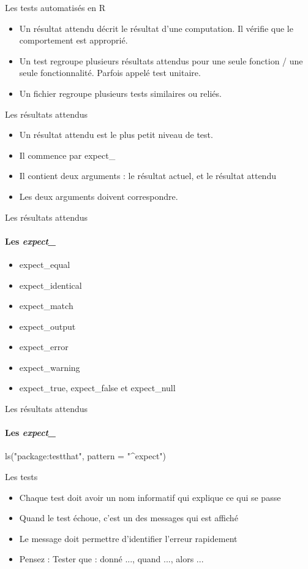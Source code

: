 \documentclass[11pt]{beamer}
\begin{document}
\begin{frame}{Les tests automatisés en R}
\begin{itemize}
\item Un résultat attendu décrit le résultat d'une computation. Il vérifie que le comportement est approprié.
\item Un test regroupe plusieurs résultats attendus pour une seule fonction / une seule fonctionnalité. Parfois appelé test unitaire.
\item Un fichier regroupe plusieurs tests similaires ou reliés.
\end{itemize}
\end{frame}

\begin{frame}{Les résultats attendus}
\begin{itemize}
\item Un résultat attendu est le plus petit niveau de test.
\item Il commence par expect\_
\item Il contient deux arguments : le résultat actuel, et le résultat attendu
\item Les deux arguments doivent correspondre.
\end{itemize}
\end{frame}

\begin{frame}{Les résultats attendus}
\framesubtitle{Les \emph{expect\_}}
\begin{itemize}
\item expect\_equal
\item expect\_identical
\item expect\_match
\item expect\_output
\item expect\_error
\item expect\_warning
\item expect\_true, expect\_false et expect\_null
\end{itemize}
\end{frame}


\begin{frame}{Les résultats attendus}
\framesubtitle{Les \emph{expect\_}}
{\ttfamily ls("package:testthat", pattern = "\^{}expect")}
\end{frame}

\begin{frame}{Les tests}
\begin{itemize}
\item Chaque test doit avoir un nom informatif qui explique ce qui se passe
\item Quand le test échoue, c'est un des messages qui est affiché
\item Le message doit permettre d'identifier l'erreur rapidement
\item Pensez : Tester que : donné ..., quand ..., alors ...
\end{itemize}
\end{frame}
\end{document}
